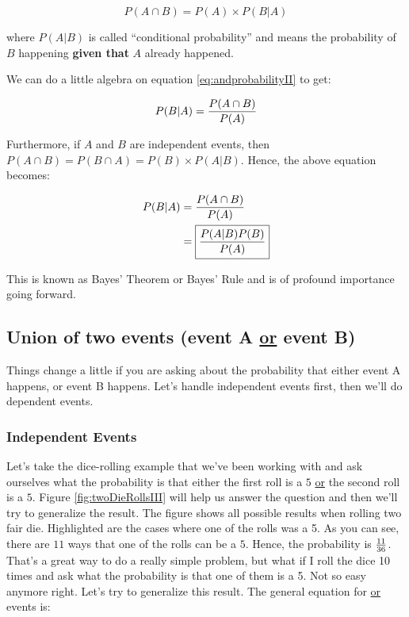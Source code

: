 \begin{equation}\label{eq:andprobabilityII}
  P(A \cap B) = P(A) \times P(B|A)
\end{equation}

where $P(A|B)$ is called ``conditional probability'' and means the
probability of $B$ happening \textbf{given that} $A$ already happened.

We can do a little algebra on equation \eqref{eq:andprobabilityII} to
get:

\begin{equation}
  P(B|A) = {P(A \cap B)\over P(A)}
\end{equation}

Furthermore, if $A$ and $B$ are independent events, then $P(A\cap B) =
P(B \cap A) = P(B) \times P(A|B)$.  Hence, the above equation becomes:

\begin{align}
  P(B|A) &= {P(A \cap B)\over P(A)}\\
         &= \boxed{{P(A|B) P(B) \over P(A)}}
\end{align}



This is known as Bayes' Theorem or Bayes' Rule and is of profound
importance going forward.



\subsection*{Union of two events (event A \underline{or} event B)}
Things change a little if you are asking about the probability that
either event A happens, or event B happens.  Let's handle independent
events first, then we'll do dependent events.

\subsubsection*{Independent Events}
Let's take the dice-rolling example that we've been working with and
ask ourselves what the probability is that either the first roll
is a $5$ \underline{or} the second roll is a $5$.  Figure
\ref{fig:twoDieRollsIII} will help us answer the question and then
we'll try to generalize the result.  The figure shows all possible
results when rolling two fair die.  Highlighted are the cases where
one of the rolls was a 5.  As you can see, there are $11$ ways that
one of the rolls can be a $5$.  Hence, the probability is ${11\over
  36}$.  That's a great way to do a really simple problem, but what if
 I roll the dice 10 times and ask what the probability is that one of
 them is a 5.  Not so easy anymore right.  Let's try to generalize
 this result.  The general equation for \underline{or} events is:


